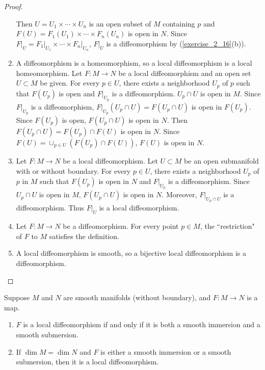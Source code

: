 \begin{proof}
\begin{enumerate}[label=(\alph*)]
      Then $U = U_1 \times \cdots \times U_n$ is an open subset of $M$ containing $p$ and $F(U) = F_1(U_1) \times \cdots \times F_n(U_n)$ is open in $N$.
      Since $F\vert_U = F_1\vert_{U_1} \times \cdots \times F_n\vert_{U_n}$, $F\vert_U$ is a diffeomorphism by (\ref{exercise_2_16}(b)).
    \item
      A diffeomorphism is a homeomorphism, so a local diffeomorphism is a local homeomorphism.
      Let $F: M \rightarrow N$ be a local diffeomorphism and an open set $U \subset M$ be given.
      For every $p \in U$, there exists a neighborhood $U_p$ of $p$ such that $F(U_p)$ is open and $F\vert_{U_p}$ is a diffeomorphism.
      $U_p \cap U$ is open in $M$.
      Since $F\vert_{U_p}$ is a diffeomorphism, $F\vert_{U_p}(U_p \cap U) = F(U_p \cap U)$ is open in $F(U_p)$.
      Since $F(U_p)$ is open, $F(U_p \cap U)$ is open in $N$.
      Then $F(U_p \cap U) = F(U_p) \cap F(U)$ is open in $N$.
      Since $F(U) = \cup_{p \in U} (F(U_p) \cap F(U))$, $F(U)$ is open in $N$.
    \item
      Let $F:M \rightarrow N$ be a local diffeomorphism.
      Let $U \subset M$ be an open submanifold with or without boundary.
      For every $p \in U$, there exists a neighborhood $U_p$ of $p$ in $M$ such that $F(U_p)$ is open in $N$ and $F\vert_{U_p}$ is a diffeomorphism.
      Since $U_p \cap U$ is open in $M$, $F(U_p \cap U)$ is open in $N$.
      Moreover, $F\vert_{U_p \cap U}$ is a diffeomorphism.
      Thus $F\vert_{U}$ is a local diffeomorphism.
    \item
      Let $F:M \rightarrow N$ be a diffeomorphism.
      For every point $p \in M$, the ``restriction" of $F$ to $M$ satisfies the definition.
    \item
      A local diffeomorphism is smooth, so a bijective local diffeomorphism is a diffeomorphism.
  \end{enumerate}
\end{proof}

\begin{customexer}{4.8}
  Suppose $M$ and $N$ are smooth manifolds (without boundary), and $F: M \rightarrow N$ is a map.
  \begin{enumerate}[label=(\alph*)]
    \item 
      $F$ is a local diffeomorphism if and only if it is both a smooth immersion and a smooth submersion.
    \item
      If $\dim M = \dim N$ and $F$ is either a smooth immersion or a smooth submersion, then it is a local diffeomorphism.
  \end{enumerate}
\end{customexer}

